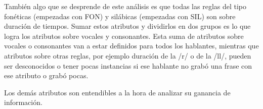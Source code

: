 \documentclass[11pt,a4paper,twoside]{tesis}
\begin{document}
También algo que se desprende de este análisis es que todas las reglas del tipo fonéticas (empezadas con FON) y silábicas (empezadas con SIL) son sobre duración de tiempos. Sumar estos atributos y dividirlos en dos grupos es lo que logra los atributos sobre vocales y consonantes. Esta suma de atributos sobre vocales o consonantes van a estar definidos para todos los hablantes, mientras que atributos sobre otras reglas, por ejemplo duración de la /r/ o de la /ll/, pueden ser desconocidos o tener pocas instancias si ese hablante no grabó una frase con ese atributo o grabó pocas. 

Los demás atributos son entendibles a la hora de analizar su ganancia de información.

\end{document}
